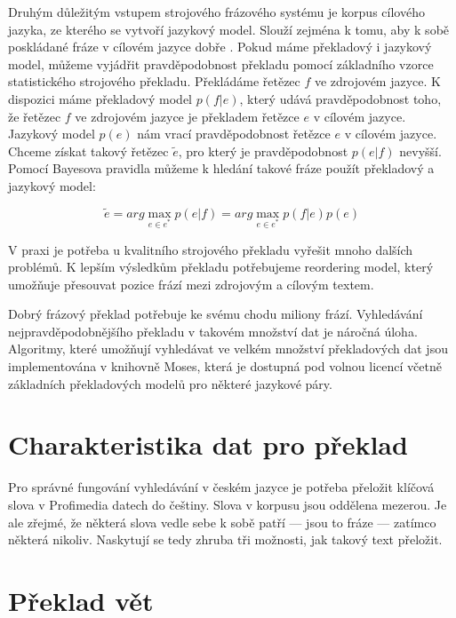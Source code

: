 Druhým důležitým vstupem strojového frázového systému je korpus cílového jazyka, ze kterého se vytvoří jazykový model. Slouží zejména k tomu, aby k sobě poskládané fráze v cílovém jazyce dobře . Pokud máme překladový i jazykový model, můžeme vyjádřit pravděpodobnost překladu pomocí základního vzorce statistického strojového překladu. Překládáme řetězec $f$ ve zdrojovém jazyce. K dispozici máme překladový model $p(f|e)$, který udává pravděpodobnost toho, že řetězec $f$ ve zdrojovém jazyce je překladem řetězce $e$ v cílovém jazyce. Jazykový model $p(e)$ nám vrací pravděpodobnost řetězce $e$ v cílovém jazyce. Chceme získat takový řetězec $\tilde{e}$, pro který je pravděpodobnost $p(e|f)$ nevyšší. Pomocí Bayesova pravidla můžeme k hledání takové fráze použít překladový a jazykový model:

\begin{equation}
 \tilde{e} = arg \max_{e \in e^*} p(e|f) = arg \max_{e\in e^*} p(f|e) p(e) 
\end{equation}

V praxi je potřeba u kvalitního strojového překladu vyřešit mnoho dalších problémů. K lepším výsledkům překladu potřebujeme reordering model, který umožňuje přesouvat pozice frází mezi zdrojovým a cílovým textem. 

Dobrý frázový překlad potřebuje ke svému chodu miliony frází. Vyhledávání nejpravděpodobnějšího překladu v takovém množství dat je náročná úloha. Algoritmy, které umožňují vyhledávat ve velkém množství překladových dat jsou implementována v knihovně Moses\cite{moses}, která je dostupná pod volnou licencí včetně základních překladových modelů pro některé jazykové páry.

\section{Charakteristika dat pro překlad}

Pro správné fungování vyhledávání v českém jazyce je potřeba přeložit klíčová slova v Profimedia datech do češtiny. Slova v korpusu jsou oddělena mezerou. Je ale zřejmé, že některá slova vedle sebe k sobě patří --- jsou to fráze --- zatímco některá nikoliv. Naskytují se tedy zhruba tři možnosti, jak takový text přeložit.


\section{Překlad vět}

